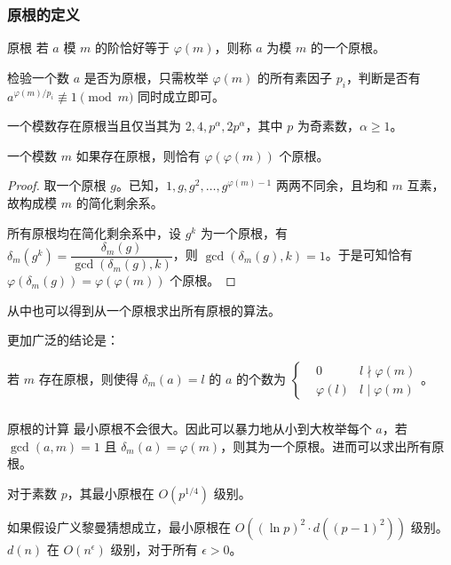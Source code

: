 \documentclass[../main.tex]{subfiles}
\begin{document}
\subsubsection{原根的定义}

\begin{frame}{原根}
若 $a$ 模 $m$ 的阶恰好等于 $\varphi(m)$，则称 $a$ 为模 $m$ 的一个原根。\pause

检验一个数 $a$ 是否为原根，只需枚举 $\varphi(m)$ 的所有素因子 $p_i$，判断是否有 $a^{\varphi(m)/p_i}\not\equiv1\pmod m$ 同时成立即可。\pause

一个模数存在原根当且仅当其为 $2,4,p^\alpha,2p^{\alpha}$，其中 $p$ 为奇素数，$\alpha\ge 1$。
\end{frame}

\begin{frame}
\begin{theo}[原根个数]
一个模数 $m$ 如果存在原根，则恰有 $\varphi(\varphi(m))$ 个原根。
\end{theo}\pause

\begin{proof}
取一个原根 $g$。已知，$1,g,g^2,\dots,g^{\varphi(m)-1}$ 两两不同余，且均和 $m$ 互素，故构成模 $m$ 的简化剩余系。\pause

所有原根均在简化剩余系中，设 $g^k$ 为一个原根，有 $\delta_m(g^k)=\dfrac{\delta_m(g)}{\gcd(\delta_m(g),k)}$，则 $\gcd(\delta_m(g),k)=1$。于是可知恰有 $\varphi(\delta_m(g))=\varphi(\varphi(m))$ 个原根。
\end{proof}\pause

从中也可以得到从一个原根求出所有原根的算法。
\end{frame}

\begin{frame}
更加广泛的结论是：

\begin{theo}
若 $m$ 存在原根，则使得 $\delta_m(a)=l$ 的 $a$ 的个数为 $\left\{\begin{aligned}&0 &l\nmid\varphi(m)\\&\varphi(l) &l\mid\varphi(m) \end{aligned} \right.$。
\end{theo}
\end{frame}

\subsubsection{}

\begin{frame}{原根的计算}
最小原根不会很大。因此可以暴力地从小到大枚举每个 $a$，若 $\gcd(a,m)=1$ 且 $\delta_m(a)=\varphi(m)$，则其为一个原根。进而可以求出所有原根。\pause
\bigskip

对于素数 $p$，其最小原根在 $O(p^{1/4})$ 级别。\pause
\medskip

如果假设广义黎曼猜想成立，最小原根在 $O((\ln p)^2\cdot d((p-1)^2))$ 级别。$d(n)$ 在 $O(n^{\epsilon})$ 级别，对于所有 $\epsilon>0$。
\end{frame}
\end{document}
